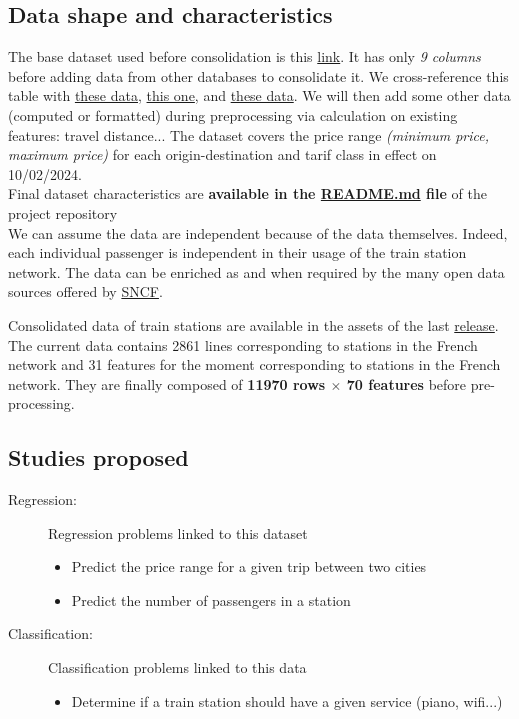 \documentclass[10pt,a4paper,hidelinks]{article}
\begin{document}
\subsection{Data shape and characteristics}
The base dataset used before consolidation is this \href{https://ressources.data.sncf.com/explore/dataset/tarifs-tgv-inoui-ouigo/information/}{link}. It has only \textit{9 columns} before adding data from other databases to consolidate it. We cross-reference this table with \href{https://ressources.data.sncf.com/explore/dataset/gares-pianos/information/}{these data}, \href{https://ressources.data.sncf.com/explore/dataset/gares-equipees-du-wifi/information/}{this one}, and \href{https://ressources.data.sncf.com/explore/dataset/frequentation-gares/information/}{these data}. We will then add some other data (computed or formatted) during preprocessing via calculation on existing features: travel distance... The dataset covers the price range \textit{(minimum price, maximum price)} for each origin-destination and tarif class in effect on 10/02/2024.\\

Final dataset characteristics are \textbf{available in the \href{https://github.com/pierre-jezegou/fib-ml-project/blob/main/README.md}{README.md} file} of the project repository\\

We can assume the data are independent because of the data themselves. Indeed, each individual passenger is independent in their usage of the train station network. The data can be enriched as and when required by the many open data sources offered by \href{https://ressources.data.sncf.com/}{SNCF}.

Consolidated data of train stations are available in the assets of the last \href{https://github.com/pierre-jezegou/fib-ml-project/releases/}{release}. The current data contains 2861 lines corresponding to stations in the French network and 31 features for the moment corresponding to stations in the French network. They are finally composed of \textbf{11970 rows $\mathbf\times$ 70 features} before pre-processing.

\subsection{Studies proposed}
\begin{description}
    \item[Regression:] Regression problems linked to this dataset
        \begin{itemize}
            \item Predict the price range for a given trip between two cities
            \item Predict the number of passengers in a station
        \end{itemize}
    \item[Classification:] Classification problems linked to this data
        \begin{itemize}
            \item Determine if a train station should have a given service (piano, wifi...)
        \end{itemize}
\end{description}
\end{document}
